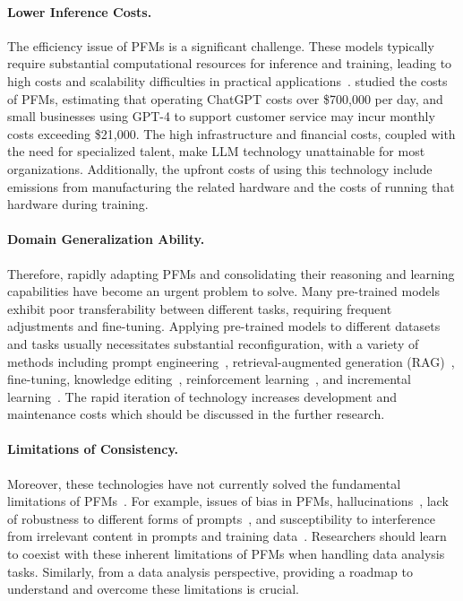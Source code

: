   \paragraph{Lower Inference Costs.} The efficiency issue of PFMs is a significant challenge. These models typically require substantial computational resources for inference and training, leading to high costs and scalability difficulties in practical applications~\cite{041zhai2022scaling}. \cite{chow2024performance} studied the costs of PFMs, estimating that operating ChatGPT costs over \$700,000 per day, and small businesses using GPT-4 to support customer service may incur monthly costs exceeding \$21,000. The high infrastructure and financial costs, coupled with the need for specialized talent, make LLM technology unattainable for most organizations. Additionally, the upfront costs of using this technology include emissions from manufacturing the related hardware and the costs of running that hardware during training.
  
  \paragraph{Domain Generalization Ability.} Therefore, rapidly adapting PFMs and consolidating their reasoning and learning capabilities have become an urgent problem to solve. Many pre-trained models exhibit poor transferability between different tasks, requiring frequent adjustments and fine-tuning. Applying pre-trained models to different datasets and tasks usually necessitates substantial reconfiguration, with a variety of methods including prompt engineering~\cite{sordoni2024joint}, retrieval-augmented generation (RAG)~\cite{gao2023retrieval}, fine-tuning, knowledge editing~\cite{Wang2023KnowledgeEF}, reinforcement learning~\cite{Kaufmann2023ASO}, and incremental learning~\cite{wu2024continual}. The rapid iteration of technology increases development and maintenance costs which should be discussed in the further research.
  
  \paragraph{Limitations of Consistency.} Moreover, these technologies have not currently solved the fundamental limitations of PFMs~\cite{bender2021dangers}. For example, issues of bias in PFMs, hallucinations~\cite{Ji2022SurveyOH}, lack of robustness to different forms of prompts~\cite{Lu2021FantasticallyOP}, and susceptibility to interference from irrelevant content in prompts and training data~\cite{Shi2023LargeLM}. Researchers should learn to coexist with these inherent limitations of PFMs when handling data analysis tasks. Similarly, from a data analysis perspective, providing a roadmap to understand and overcome these limitations is crucial.
  
